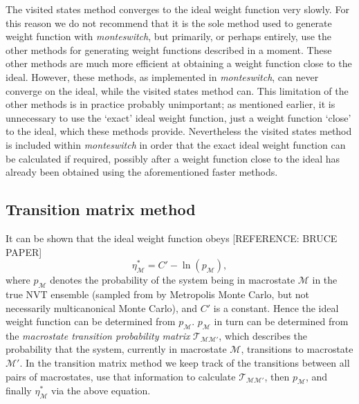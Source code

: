 \documentclass{report}
\begin{document}
The visited states method converges to the ideal weight function very slowly. For this reason we do not recommend that it is the sole method used to 
generate weight function with \emph{monteswitch}, but primarily, or perhaps entirely, use the other methods for generating weight functions described 
in a moment. These other methods are much more efficient at obtaining a weight function close to the ideal. However, these methods, as implemented in 
\emph{monteswitch}, can never converge on the ideal, while the visited states method can. This limitation of the other methods is in practice probably
unimportant; as mentioned earlier, it is unnecessary to use the `exact' ideal weight function, just a weight function `close' to the ideal, which
these methods provide. Nevertheless the visited states method is included within \emph{monteswitch} in order that the exact ideal weight function can
be calculated if required, possibly after a weight function close to the ideal has already been obtained using the aforementioned faster methods.

\subsection{Transition matrix method}
It can be shown that the ideal weight function obeys [REFERENCE: BRUCE PAPER]
\begin{equation}\label{ideal_wf}
\eta_{\mathcal{M}}^*=C'-\ln(p_{\mathcal{M}}),
\end{equation}
where $p_{\mathcal{M}}$ denotes the probability of the system being in macrostate $\mathcal{M}$ in the true NVT ensemble (sampled from by Metropolis
Monte Carlo, but not necessarily multicanonical Monte Carlo), and $C'$ is a constant. 
Hence the ideal weight function can be determined from $p_{\mathcal{M}}$. $p_{\mathcal{M}}$ 
in turn can be determined from the \emph{macrostate transition probability matrix} $\mathcal{T}_{\mathcal{MM}'}$, which describes the probability that
the system, currently in macrostate $\mathcal{M}$, transitions to macrostate $\mathcal{M}'$. 
In the transition matrix method we keep track of the transitions between all pairs of macrostates, use that information to calculate 
$\mathcal{T}_{\mathcal{MM}'}$, then $p_{\mathcal{M}}$, and finally $\eta_{\mathcal{M}}^*$ via the above equation.
\end{document}
